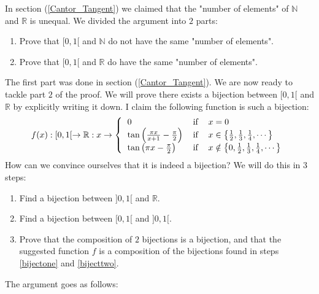 \noindent In section (\ref{Cantor_Tangent}) we claimed that the "number of elements" of $\mathbb{N}$ and $\mathbb{R}$ is unequal. We divided the argument into $2$ parts:
\begin{enumerate}
\item Prove that $[0,1[$ and $\mathbb{N}$ do not have the same "number of elements".
\item Prove that $[0,1[$ and $\mathbb{R}$ do have the same "number of elements".
\end{enumerate}
\noindent The first part was done in section (\ref{Cantor_Tangent}). We are now ready to tackle part $2$ of the proof. We will prove there exists a bijection between $[0,1[$ and $\mathbb{R}$ by explicitly writing it down. I claim the following function is such a bijection:
\begin{equation*}
f (x) : [0,1[ \rightarrow \mathbb{R}: x \rightarrow \left\{
\begin{tabular}{lcl}
$0$ & if & $x=0$ \\
$\tan \left( \frac{\pi x}{x+1} - \frac{\pi}{2} \right)$ & if & $x \in \left\{ \frac{1}{2}, \frac{1}{3}, \frac{1}{4},\cdots \right\}$\\
$\tan \left( \pi x - \frac{\pi}{2} \right)$ & if & $x \notin \left\{ 0, \frac{1}{2}, \frac{1}{3}, \frac{1}{4},\cdots \right\}$
\end{tabular}
\right.
\end{equation*}
\noindent How can we convince ourselves that it is indeed a bijection? We will do this in $3$ steps:
\begin{enumerate}[i]
\item \label{bijectone} Find a bijection between $]0,1[$ and $\mathbb{R}$.
\item \label{bijecttwo} Find a bijection between $[0,1[$ and $]0,1[$.
\item Prove that the composition of $2$ bijections is a bijection, and that the suggested function $f$ is a composition of the bijections found in steps \ref{bijectone} and \ref{bijecttwo}.
\end{enumerate}
\noindent The argument goes as follows:
